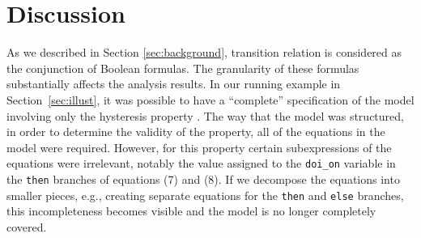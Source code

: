 \section{Discussion}
\label{sec:discussion}
\iffalse As mentioned, IVCs are derived from inductive invariants; in other words, they are built upon the proof of the validity of a given property. One interesting fact about proofs
  is that a given property could be proved from different proof paths.
  The $AIVC$ captures this fact and gives a clear picture of various ways a property is satisfied. By getting all the MIVCs for the system properties and categorizing them, one can find if there are design artifacts that do not trace to any property: set $\bigcap \{IRR (P) | P \in \Delta \}$.  If this set is non-empty, it is a possible indication of ``gold plating" or missing properties \cite{Murugesan16:renext}.
\fi



As we described in Section \ref{sec:background}, transition relation is considered
as the conjunction of Boolean formulas. The granularity of these formulas substantially affects the analysis results.  In our running example in Section~\ref{sec:illust}, it was possible to have a ``complete'' specification of the model involving only the hysteresis property \hystp.  The way that the model was structured, in order to determine the validity of the property, all of the equations in the model were required.  However, for this property certain subexpressions of the equations were irrelevant, notably the value assigned to the {\small{ \texttt{doi\_on}}} variable in the {\small{ \texttt{then}}} branches of equations (7) and (8).  If we decompose the equations into smaller pieces, e.g., creating separate equations for the {\small{ \texttt{then}}} and {\small{ \texttt{else}}} branches, this incompleteness becomes visible and the model is no longer completely covered.

